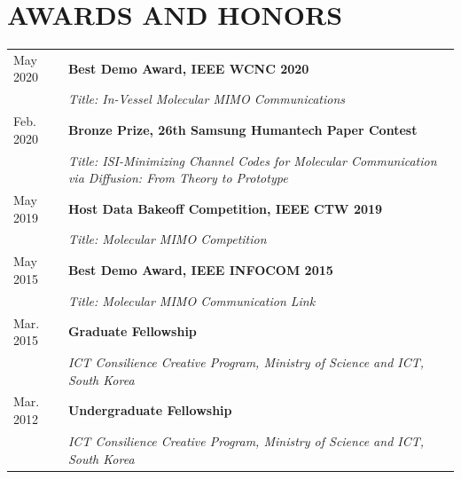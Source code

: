 \documentclass[a4paper,9pt]{extarticle}
\begin{document}
\section*{AWARDS AND HONORS}
\noindent
\begin{tabularx}{\textwidth}{@{} p{2cm} X @{}}
    May 2020 & \textbf{Best Demo Award, IEEE WCNC 2020} \\
              & \textit{Title: In-Vessel Molecular MIMO Communications} \\ \addlinespace[0.5em]
    
    Feb. 2020 & \textbf{Bronze Prize, 26th Samsung Humantech Paper Contest} \\
              & \textit{Title: ISI-Minimizing Channel Codes for Molecular Communication via Diffusion: From Theory to Prototype} \\ \addlinespace[0.5em]

    May 2019 & \textbf{Host Data Bakeoff Competition, IEEE CTW 2019} \\
              & \textit{Title: Molecular MIMO Competition} \\ \addlinespace[0.5em]
    
    May 2015 & \textbf{Best Demo Award, IEEE INFOCOM 2015} \\
              & \textit{Title: Molecular MIMO Communication Link} \\ \addlinespace[0.5em]
    
    Mar. 2015 & \textbf{Graduate Fellowship} \\
              & \textit{ICT Consilience Creative Program, Ministry of Science and ICT, South Korea} \\ \addlinespace[0.5em]
              
    Mar. 2012 & \textbf{Undergraduate Fellowship} \\
              & \textit{ICT Consilience Creative Program, Ministry of Science and ICT, South Korea} \\
\end{tabularx}


\end{document}
